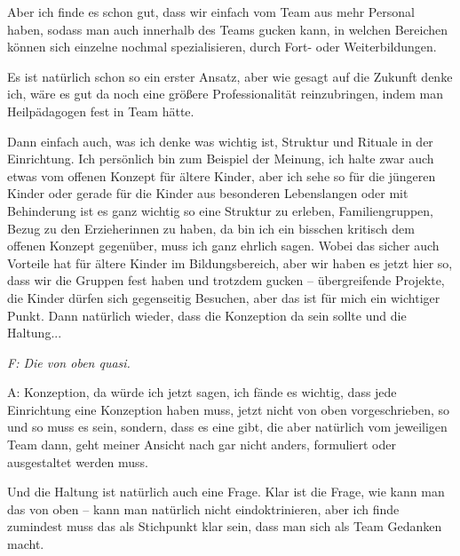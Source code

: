 \begin{linenumbers*}
Aber ich finde es schon gut, dass wir einfach vom Team aus mehr Personal haben, sodass man auch innerhalb des Teams gucken kann, in welchen Bereichen können sich einzelne nochmal spezialisieren, durch Fort- oder Weiterbildungen. 

Es ist natürlich schon so ein erster Ansatz, aber wie gesagt auf die Zukunft denke ich, wäre es gut da noch eine größere Professionalität reinzubringen, indem man Heilpädagogen fest in Team hätte. 

Dann einfach auch, was ich denke was wichtig ist, Struktur und Rituale in der Einrichtung. Ich persönlich bin zum Beispiel der Meinung, ich halte zwar auch etwas vom offenen Konzept für ältere Kinder, aber ich sehe so für die jüngeren Kinder oder gerade für die  Kinder aus besonderen Lebenslangen oder mit Behinderung ist es ganz wichtig so eine Struktur zu erleben, Familiengruppen, Bezug zu den Erzieherinnen zu haben, da bin ich ein bisschen kritisch dem offenen Konzept gegenüber, muss ich ganz ehrlich sagen. Wobei das sicher auch Vorteile hat für ältere Kinder im Bildungsbereich, aber wir haben es jetzt hier so, dass wir die Gruppen fest haben und trotzdem gucken – übergreifende Projekte, die Kinder dürfen sich gegenseitig Besuchen, aber das ist für mich ein wichtiger Punkt. Dann natürlich wieder, dass die Konzeption da sein sollte und die Haltung...

\emph{F: Die von oben quasi.}

A: Konzeption, da würde ich jetzt sagen, ich fände es wichtig, dass jede Einrichtung eine Konzeption haben muss, jetzt nicht von oben vorgeschrieben, so und so muss es sein, sondern, dass es eine gibt, die aber natürlich vom jeweiligen Team dann, geht meiner Ansicht nach gar nicht anders, formuliert oder ausgestaltet werden muss. 

Und die Haltung ist natürlich auch eine Frage. Klar ist die Frage, wie kann man das von oben – kann man natürlich nicht eindoktrinieren, aber ich finde zumindest muss das als Stichpunkt klar sein, dass man sich als Team Gedanken macht. 


\end{linenumbers*}
